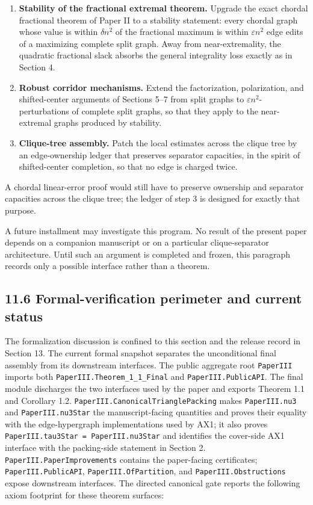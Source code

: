 \documentclass[
  american,
  11pt,
  a4paper,
]{article}
\begin{document}
\begin{enumerate}
\def\labelenumi{\arabic{enumi}.}
\item
  \textbf{Stability of the fractional extremal theorem.} Upgrade the exact chordal fractional theorem of Paper II to a stability statement: every chordal graph whose value is within \(\delta n^2\) of the fractional maximum is within \(\varepsilon n^2\) edge edits of a maximizing complete split graph. Away from near-extremality, the quadratic fractional slack absorbs the general integrality loss exactly as in Section 4.
\item
  \textbf{Robust corridor mechanisms.} Extend the factorization, polarization, and shifted-center arguments of Sections 5--7 from split graphs to \(\varepsilon n^2\)-perturbations of complete split graphs, so that they apply to the near-extremal graphs produced by stability.
\item
  \textbf{Clique-tree assembly.} Patch the local estimates across the clique tree by an edge-ownership ledger that preserves separator capacities, in the spirit of shifted-center completion, so that no edge is charged twice.
\end{enumerate}

A chordal linear-error proof would still have to preserve ownership and separator capacities across the clique tree; the ledger of step 3 is designed for exactly that purpose.

A future installment may investigate this program. No result of the present paper depends on a companion manuscript or on a particular clique-separator architecture. Until such an argument is completed and frozen, this paragraph records only a possible interface rather than a theorem.

\subsection{11.6 Formal-verification perimeter and current status}\label{formal-verification-perimeter-and-current-status}

The formalization discussion is confined to this section and the release record in Section 13. The current formal snapshot separates the unconditional final assembly from its downstream interfaces. The public aggregate root \texttt{PaperIII} imports both \texttt{PaperIII.Theorem\_1\_1\_Final} and \texttt{PaperIII.PublicAPI}. The final module discharges the two interfaces used by the paper and exports Theorem 1.1 and Corollary 1.2. \texttt{PaperIII.CanonicalTrianglePacking} makes \texttt{PaperIII.nu3} and \texttt{PaperIII.nu3Star} the manuscript-facing quantities and proves their equality with the edge-hypergraph implementations used by AX1; it also proves \texttt{PaperIII.tau3Star\ =\ PaperIII.nu3Star} and identifies the cover-side AX1 interface with the packing-side statement in Section 2. \texttt{PaperIII.PaperImprovements} contains the paper-facing certificates; \texttt{PaperIII.PublicAPI}, \texttt{PaperIII.OfPartition}, and \texttt{PaperIII.Obstructions} expose downstream interfaces. The directed canonical gate reports the following axiom footprint for these theorem surfaces:
\end{document}
